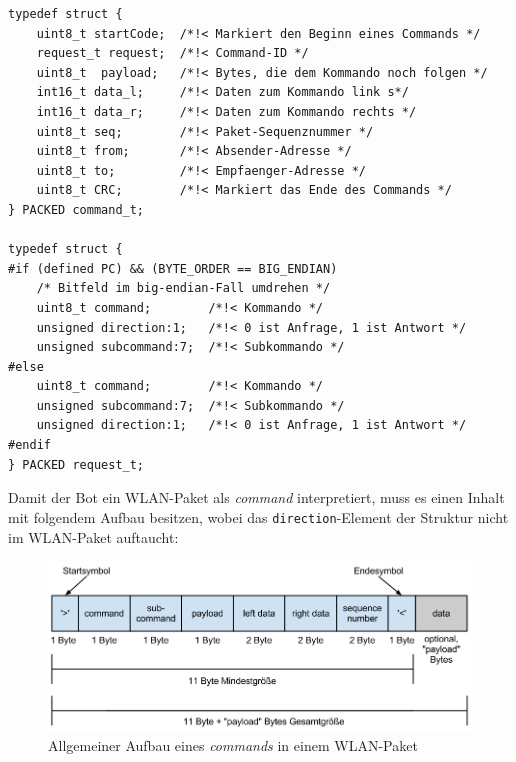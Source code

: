 \newpage

\begin{verbatim}
typedef struct {
    uint8_t startCode;  /*!< Markiert den Beginn eines Commands */
    request_t request;  /*!< Command-ID */
    uint8_t  payload;   /*!< Bytes, die dem Kommando noch folgen */
    int16_t data_l;     /*!< Daten zum Kommando link s*/
    int16_t data_r;     /*!< Daten zum Kommando rechts */
    uint8_t seq;        /*!< Paket-Sequenznummer */
    uint8_t from;       /*!< Absender-Adresse */
    uint8_t to;         /*!< Empfaenger-Adresse */
    uint8_t CRC;        /*!< Markiert das Ende des Commands */
} PACKED command_t;

typedef struct {
#if (defined PC) && (BYTE_ORDER == BIG_ENDIAN)
    /* Bitfeld im big-endian-Fall umdrehen */
    uint8_t command;        /*!< Kommando */
    unsigned direction:1;   /*!< 0 ist Anfrage, 1 ist Antwort */
    unsigned subcommand:7;  /*!< Subkommando */
#else
    uint8_t command;        /*!< Kommando */
    unsigned subcommand:7;  /*!< Subkommando */
    unsigned direction:1;   /*!< 0 ist Anfrage, 1 ist Antwort */
#endif
} PACKED request_t;
\end{verbatim}

Damit der Bot ein WLAN-Paket als \textit{command} interpretiert, muss es einen Inhalt mit folgendem Aufbau besitzen,
wobei das \verb|direction|-Element der Struktur nicht im WLAN-Paket auftaucht:
\begin{figure}[H]
    \centering
    \includegraphics[scale=0.5]{pic/ctBotWlanAllgemein}
    \caption{Allgemeiner Aufbau eines \textit{commands} in einem WLAN-Paket}
    \label{ctBotWlanAllgemein}
\end{figure}


